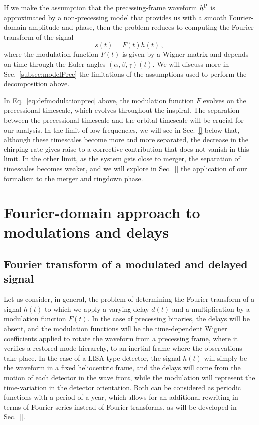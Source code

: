 \documentclass[aps,showpacs,%
prd,superscriptaddress,nofootinbib]{revtex4}
\newcommand{\be}{\begin{equation}}
\newcommand{\ee}{\end{equation}}
\begin{document}
If we make the assumption that the precessing-frame waveform $h^{\rm P}$ is approximated by a non-precessing model that provides us with a smooth Fourier-domain amplitude and phase, then the problem reduces to computing the Fourier transform of the signal
\be\label{eq:defmodulationprec}
	s(t) = F(t) h(t) \,,
\ee
where the modulation function $F(t)$ is given by a Wigner matrix and depends on time through the Euler angles $(\alpha, \beta, \gamma)(t)$. We will discuss more in Sec.~\ref{subsec:modelPrec} the limitations of the assumptions used to perform the decomposition above.

In Eq.~\eqref{eq:defmodulationprec} above, the modulation function $F$ evolves on the precessional timescale, which evolves throughout the inspiral. The separation between the precessional timescale and the orbital timescale will be crucial for our analysis. In the limit of low frequencies, we will see in Sec.~\ref{} below that, although these timescales become more and more separated, the decrease in the chirping rate gives raise to a corrective contribution that does not vanish in this limit. In the other limit, as the system gets close to merger, the separation of timescales becomes weaker, and we will explore in Sec.~\ref{} the application of our formalism to the merger and ringdown phase.


\section{Fourier-domain approach to modulations and delays}
\label{sec:formalism}


\subsection{Fourier transform of a modulated and delayed signal}
\label{subsec:FTgeneral}

Let us consider, in general, the problem of determining the Fourier transform of a signal $h(t)$ to which we apply a varying delay $d(t)$ and a multiplication by a modulation function $F(t)$. In the case of precessing binaries, the delays will be absent, and the modulation functions will be the time-dependent Wigner coefficients applied to rotate the waveform from a precessing frame, where it verifies a restored mode hierarchy, to an inertial frame where the observations take place. In the case of a LISA-type detector, the signal $h(t)$ will simply be the waveform in a fixed heliocentric frame, and the delays will come from the motion of each detector in the wave front, while the modulation will represent the time-variation in the detector orientation. Both can be considered as periodic functions with a period of a year, which allows for an additional rewriting in terms of Fourier series instead of Fourier transforms, as will be developed in Sec.~\ref{}. 
\end{document}
